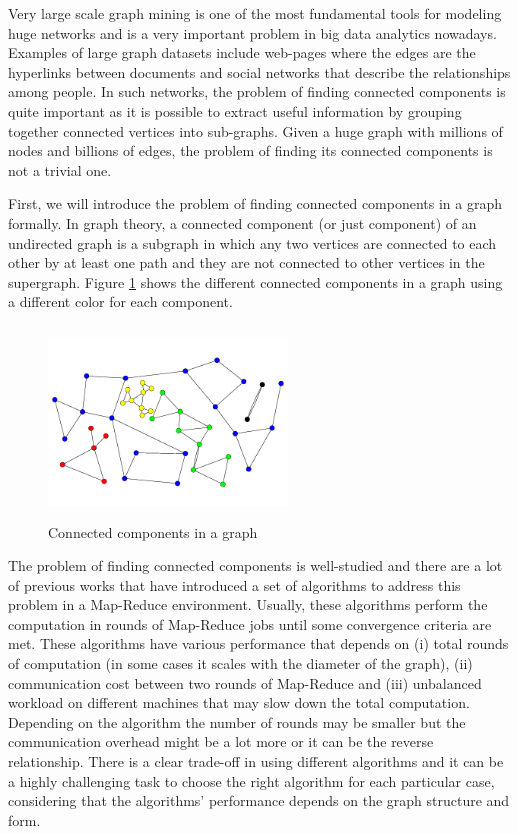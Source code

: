 Very large scale graph mining is one of the most fundamental tools for modeling huge networks and is a very important problem in big data analytics nowadays. Examples of large graph datasets include web-pages where the edges are the hyperlinks between documents and social networks that describe the relationships among people. In such networks, the problem of finding connected components is quite important as it is possible to extract useful information by grouping together connected vertices into sub-graphs. Given a huge graph with millions of nodes and billions of edges, the problem of finding its connected components is not a trivial one.

First, we will introduce the problem of finding connected components in a graph formally. In graph theory, a connected component (or just component) of an undirected graph is a subgraph in which any two vertices are connected to each other by at least one path and they are not connected to other vertices in the supergraph. Figure \ref{figure:connected} shows the different connected components in a graph using a different color for each component.

\begin{figure}[!h]
 \centering
    \includegraphics[height=12pc,width=15pc]{figures/connected_components.png}
	\caption{Connected components in a graph}
    \label{figure:connected}
\end{figure}

The problem of finding connected components is well-studied and there are a lot of previous works that have introduced a set of algorithms to address this problem in a Map-Reduce \cite{mapreduce} environment. Usually, these algorithms perform the computation in rounds of Map-Reduce jobs until some convergence criteria are met. These algorithms have various performance that depends on (i) total rounds of computation (in some cases it scales with the diameter of the graph), (ii) communication cost between two rounds of Map-Reduce and (iii) unbalanced workload on different machines that may slow down the total computation. Depending on the algorithm the number of rounds may be smaller but the communication overhead might be a lot more or it can be the reverse relationship. There is a clear trade-off in using different algorithms and it can be a highly challenging task to choose the right algorithm for each particular case, considering that the algorithms' performance depends on the graph structure and form.

